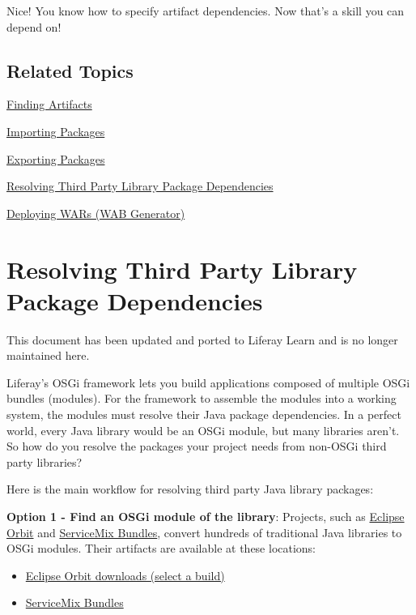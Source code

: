 \noindent\hrulefill

Nice! You know how to specify artifact dependencies. Now that's a skill
you can depend on!

\section{Related Topics}\label{related-topics-1}

\href{/docs/7-2/customization/-/knowledge_base/c/finding-artifacts}{Finding
Artifacts}

\href{/docs/7-2/customization/-/knowledge_base/c/importing-packages}{Importing
Packages}

\href{/docs/7-2/customization/-/knowledge_base/c/exporting-packages}{Exporting
Packages}

\href{/docs/7-2/customization/-/knowledge_base/c/adding-third-party-libraries-to-a-module}{Resolving
Third Party Library Package Dependencies}

\href{/docs/7-2/customization/-/knowledge_base/c/deploying-wars-wab-generator}{Deploying
WARs (WAB Generator)}

\chapter{Resolving Third Party Library Package
Dependencies}\label{resolving-third-party-library-package-dependencies}

{ This document has been updated and ported to Liferay Learn and is no
longer maintained here.}

Liferay's OSGi framework lets you build applications composed of
multiple OSGi bundles (modules). For the framework to assemble the
modules into a working system, the modules must resolve their Java
package dependencies. In a perfect world, every Java library would be an
OSGi module, but many libraries aren't. So how do you resolve the
packages your project needs from non-OSGi third party libraries?

Here is the main workflow for resolving third party Java library
packages:

\textbf{Option 1 - Find an OSGi module of the library}: Projects, such
as \href{https://www.eclipse.org/orbit/}{Eclipse Orbit} and
\href{https://servicemix.apache.org/developers/source/bundles-source.html}{ServiceMix
Bundles}, convert hundreds of traditional Java libraries to OSGi
modules. Their artifacts are available at these locations:

\begin{itemize}
\tightlist
\item
  \href{https://download.eclipse.org/tools/orbit/downloads/}{Eclipse
  Orbit downloads (select a build)}
\item
  \href{https://mvnrepository.com/artifact/org.apache.servicemix.bundles}{ServiceMix
  Bundles}
\end{itemize}

